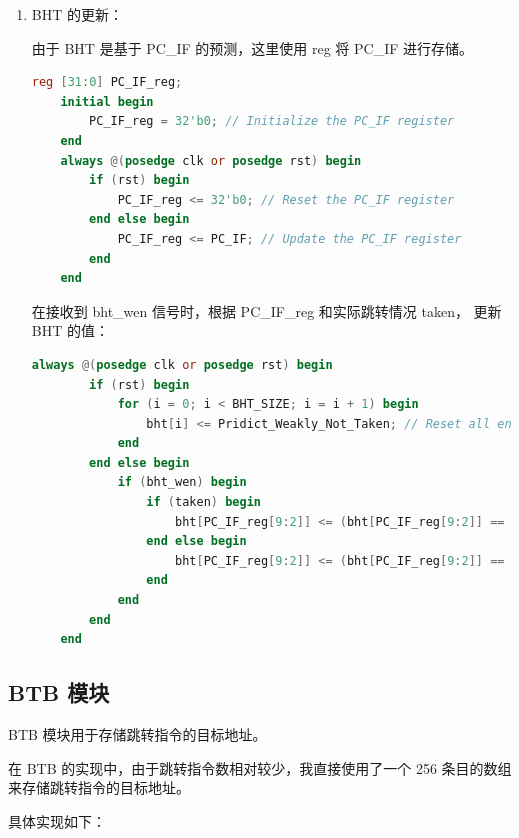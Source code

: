 \documentclass{article}
\begin{document}
\begin{enumerate}
    \item BHT 的更新：\par
    由于 BHT 是基于 PC\_IF 的预测，这里使用 reg 将 PC\_IF 进行存储。\par
    \begin{lstlisting}[language=Verilog]
    reg [31:0] PC_IF_reg;
    initial begin
        PC_IF_reg = 32'b0; // Initialize the PC_IF register
    end
    always @(posedge clk or posedge rst) begin
        if (rst) begin
            PC_IF_reg <= 32'b0; // Reset the PC_IF register
        end else begin
            PC_IF_reg <= PC_IF; // Update the PC_IF register
        end
    end
    \end{lstlisting}

    在接收到 bht\_wen 信号时，根据 PC\_IF\_reg 和实际跳转情况 taken， 更新 BHT 的值：\par
    \begin{lstlisting}[language=Verilog]
    always @(posedge clk or posedge rst) begin
        if (rst) begin
            for (i = 0; i < BHT_SIZE; i = i + 1) begin
                bht[i] <= Pridict_Weakly_Not_Taken; // Reset all entries to Weakly Not Taken
            end
        end else begin
            if (bht_wen) begin
                if (taken) begin
                    bht[PC_IF_reg[9:2]] <= (bht[PC_IF_reg[9:2]] == Pridict_Strongly_Taken) ? Pridict_Strongly_Taken : bht[PC_IF_reg[9:2]] + 1; // Increment if taken
                end else begin
                    bht[PC_IF_reg[9:2]] <= (bht[PC_IF_reg[9:2]] == Pridict_Strongly_Not_Taken) ? Pridict_Strongly_Not_Taken : bht[PC_IF_reg[9:2]] - 1; // Decrement if not taken
                end
            end
        end
    end
    \end{lstlisting}
\end{enumerate}

\subsection{BTB 模块}
BTB 模块用于存储跳转指令的目标地址。\par
在 BTB 的实现中，由于跳转指令数相对较少，我直接使用了一个 256 条目的数组来存储跳转指令的目标地址。\par
具体实现如下：\par
\end{document}
